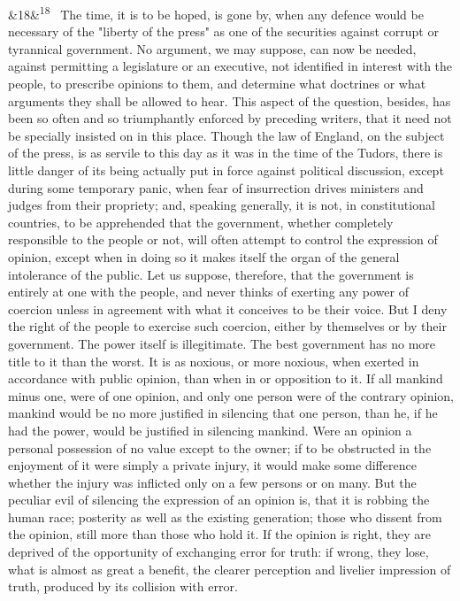 \documentclass[12pt]{article}
\newcommand{\para}[1][]{\par\noindent\ifx&#1&\else\textsuperscript{\footnotesize #1}~\fi}
\begin{document}
\para[18] The time, it is to be hoped, is gone by, when any defence would be necessary of the "liberty of the press" as one of the securities against corrupt or tyrannical government. No argument, we may suppose, can now be needed, against permitting a legislature or an executive, not identified in interest with the people, to prescribe opinions to them, and determine what doctrines or what arguments they shall be allowed to hear. This aspect of the question, besides, has been so often and so triumphantly enforced by preceding writers, that it need not be specially insisted on in this place. Though the law of England, on the subject of the press, is as servile to this day as it was in the time of the Tudors, there is little danger of its being actually put in force against political discussion, except during some temporary panic, when fear of insurrection drives ministers and judges from their propriety; and, speaking generally, it is not, in constitutional countries, to be apprehended that the government, whether completely responsible to the people or not, will often attempt to control the expression of opinion, except when in doing so it makes itself the organ of the general intolerance of the public. Let us suppose, therefore, that the government is entirely at one with the people, and never thinks of exerting any power of coercion unless in agreement with what it conceives to be their voice. But I deny the right of the people to exercise such coercion, either by themselves or by their government. The power itself is illegitimate. The best government has no more title to it than the worst. It is as noxious, or more noxious, when exerted in accordance with public opinion, than when in or opposition to it. If all mankind minus one, were of one opinion, and only one person were of the contrary opinion, mankind would be no more justified in silencing that one person, than he, if he had the power, would be justified in silencing mankind. Were an opinion a personal possession of no value except to the owner; if to be obstructed in the enjoyment of it were simply a private injury, it would make some difference whether the injury was inflicted only on a few persons or on many. But the peculiar evil of silencing the expression of an opinion is, that it is robbing the human race; posterity as well as the existing generation; those who dissent from the opinion, still more than those who hold it. If the opinion is right, they are deprived of the opportunity of exchanging error for truth: if wrong, they lose, what is almost as great a benefit, the clearer perception and livelier impression of truth, produced by its collision with error.
\end{document}
